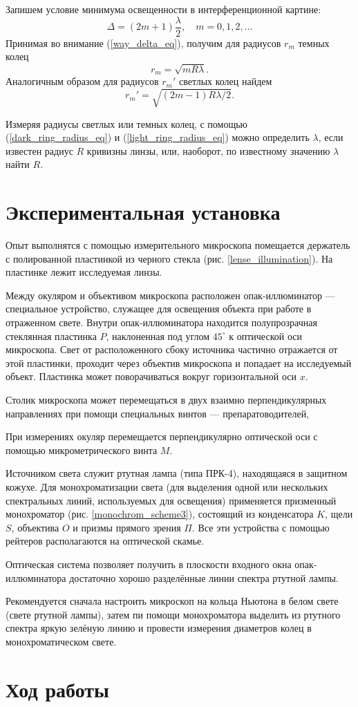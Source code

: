 \documentclass[a4paper, 12pt]{article}
\begin{document}
	Запишем условие минимума освещенности в интерференционной картине:
	\begin{equation}
		\Delta=\left(2m+1\right)\frac{\lambda}{2}, \quad m=0,1,2, ...
	\end{equation}
	Принимая во внимание (\ref{way_delta_eq}), получим для радиусов $r_m$ темных колец
	\begin{equation}
		r_m=\sqrt{mR\lambda}.
		\label{dark_ring_radius_eq}
	\end{equation}
	Аналогичным образом для радиусов $r_m'$ светлых колец найдем
	\begin{equation}
		r_m'=\sqrt{\left(2m-1\right)R\lambda/2}.
		\label{light_ring_radius_eq}
	\end{equation}
	\par
	Измеряя радиусы светлых или темных колец, с помощью (\ref{dark_ring_radius_eq}) и (\ref{light_ring_radius_eq}) можно определить $\lambda$, если известен радиус $R$ кривизны линзы, или, наоборот, по известному значению $\lambda$ найти $R$.
	\section{Экспериментальная установка}
	Опыт выполнятся с помощью измерительного микроскопа помещается держатель с полированной пластинкой из черного стекла (рис. \ref{lense_illumination}). На пластинке лежит исследуемая линзы.\par
	Между окуляром и объективом микроскопа расположен опак-иллюминатор — специальное устройство, служащее для освещения объекта при работе в отраженном свете. Внутри опак-иллюминатора находится полупрозрачная стеклянная пластинка $P$, наклоненная под углом $45^\circ$ к оптической оси микроскопа. Свет от расположенного сбоку источника частично отражается от этой пластинки, проходит через объектив микроскопа и попадает на исследуемый объект. Пластинка может поворачиваться вокруг горизонтальной оси $x$.\par
	Столик микроскопа может перемещаться в двух взаимно перпендикулярных направлениях при помощи специальных винтов — препаратоводителей,\par
	При измерениях окуляр перемещается перпендикулярно оптической оси с помощью микрометрического винта $M$.\par
	Источником света служит ртутная лампа (типа ПРК-4), находящаяся в защитном кожухе. Для монохроматизации света (для выделения одной или нескольких спектральных линий, используемых для освещения) применяется призменный монохроматор (рис. \ref{monochrom_scheme3}), состоящий из конденсатора $K$, щели $S$, объектива $O$ и призмы прямого зрения $\Pi$. Все эти устройства с помощью рейтеров располагаются на оптической скамье.\par
	Оптическая система позволяет получить в плоскости входного окна опак-иллюминатора достаточно хорошо разделённые линии спектра ртутной лампы.\par
	Рекомендуется сначала настроить микроскоп на кольца Ньютона в белом свете (свете ртутной лампы), затем пи помощи монохроматора выделить из ртутного спектра яркую зелёную линию и провести измерения диаметров колец в монохроматическом свете.
	\section{Ход работы}
	
\end{document}

